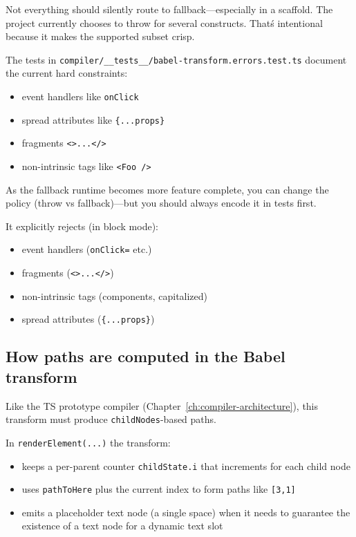 Not everything should silently route to fallback---especially in a scaffold.
The project currently chooses to throw for several constructs.
That\'s intentional because it makes the supported subset crisp.

The tests in \texttt{compiler/\_\_tests\_\_/babel-transform.errors.test.ts} document the current hard constraints:

\begin{itemize}
\item event handlers like \texttt{onClick}
\item spread attributes like \texttt{\{...props\}}
\item fragments \texttt{<>...</>}
\item non-intrinsic tags like \texttt{<Foo />}
\end{itemize}

As the fallback runtime becomes more feature complete, you can change the policy (throw vs fallback)---but you should always encode it in tests first.

It explicitly rejects (in block mode):

\begin{itemize}
\item event handlers (\texttt{onClick=} etc.)
\item fragments (\texttt{<>...</>})
\item non-intrinsic tags (components, capitalized)
\item spread attributes (\texttt{\{...props\}})
\end{itemize}

\subsection{How paths are computed in the Babel transform}

Like the TS prototype compiler (Chapter~\ref{ch:compiler-architecture}), this transform must produce \texttt{childNodes}-based paths.

In \texttt{renderElement(...)} the transform:

\begin{itemize}
\item keeps a per-parent counter \texttt{childState.i} that increments for each child node
\item uses \texttt{pathToHere} plus the current index to form paths like \texttt{[3,1]}
\item emits a placeholder text node (a single space) when it needs to guarantee the existence of a text node for a dynamic text slot
\end{itemize}

